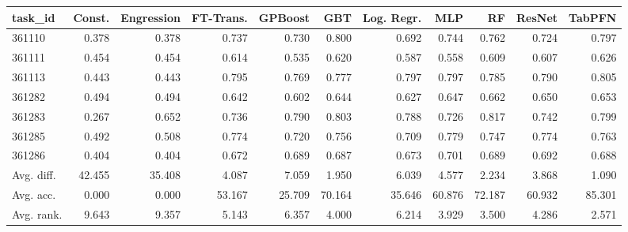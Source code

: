 \begin{tabular}{lrrrrrrrrrr}
\toprule
task\_id & Const. & Engression & FT-Trans. & GPBoost & GBT & Log. Regr. & MLP & RF & ResNet & TabPFN \\
\midrule
361110 & 0.378 & 0.378 & 0.737 & 0.730 & 0.800 & 0.692 & 0.744 & 0.762 & 0.724 & 0.797 \\
361111 & 0.454 & 0.454 & 0.614 & 0.535 & 0.620 & 0.587 & 0.558 & 0.609 & 0.607 & 0.626 \\
361113 & 0.443 & 0.443 & 0.795 & 0.769 & 0.777 & 0.797 & 0.797 & 0.785 & 0.790 & 0.805 \\
361282 & 0.494 & 0.494 & 0.642 & 0.602 & 0.644 & 0.627 & 0.647 & 0.662 & 0.650 & 0.653 \\
361283 & 0.267 & 0.652 & 0.736 & 0.790 & 0.803 & 0.788 & 0.726 & 0.817 & 0.742 & 0.799 \\
361285 & 0.492 & 0.508 & 0.774 & 0.720 & 0.756 & 0.709 & 0.779 & 0.747 & 0.774 & 0.763 \\
361286 & 0.404 & 0.404 & 0.672 & 0.689 & 0.687 & 0.673 & 0.701 & 0.689 & 0.692 & 0.688 \\
Avg. diff. & 42.455 & 35.408 & 4.087 & 7.059 & 1.950 & 6.039 & 4.577 & 2.234 & 3.868 & 1.090 \\
Avg. acc. & 0.000 & 0.000 & 53.167 & 25.709 & 70.164 & 35.646 & 60.876 & 72.187 & 60.932 & 85.301 \\
Avg. rank. & 9.643 & 9.357 & 5.143 & 6.357 & 4.000 & 6.214 & 3.929 & 3.500 & 4.286 & 2.571 \\
\bottomrule
\end{tabular}

